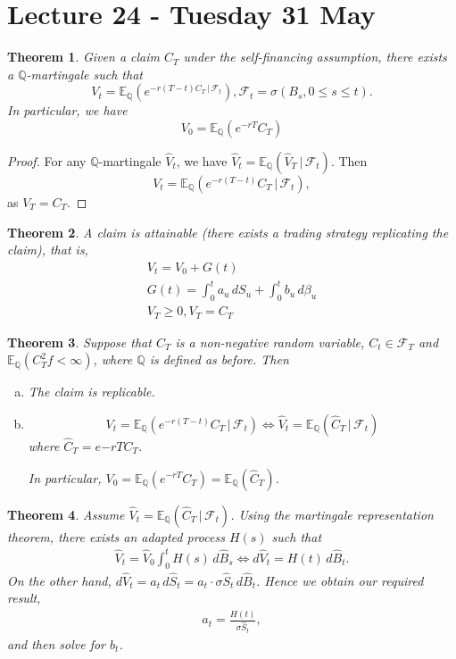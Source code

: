 \documentclass[10pt, oneside, reqno]{amsart}
\theoremstyle{plain}%
\newtheorem{thm}{Theorem}[section]
\theoremstyle{definition}
\theoremstyle{remark}
\newcommand{\given}{ \, | \,}
\newcommand{\Q}{\mathbb{Q}}
\newcommand{\E}{\mathbb{E}}
\newcommand{\sigf}{\mathcal{F}}
\begin{document}
\section{Lecture 24 - Tuesday 31 May} %
\label{sec:lecture_24_tuesday_31_may}
\begin{thm}
    Given a claim $C_T$ under the self-financing assumption, there exists a $\Q$-martingale such that \[
        V_t = \E_\Q\left( e^{-r(T-t) C_T \given \sigf_t} \right), \sigf_t = \sigma(B_s, 0 \leq s \leq t).
    \] In particular, we have \[
        V_0 = \E_\Q(e^{-rT}C_T)
    \]
\end{thm}

\begin{proof}
    For any $\Q$-martingale $\hat V_t$, we have $\hat V_t = \E_\Q(\hat V_T \given \sigf_t)$.  Then \[
        V_t = \E_\Q(e^{-r(T-t)}C_T \given \sigf_t),
    \] as $V_T = C_T$.  
\end{proof}

\begin{thm}
    A claim is attainable (there exists a trading strategy replicating the claim), that is, \begin{align*}
        V_t = V_0 + G(t) \\
        G(t) = \int_0^t a_u \, dS_u + \int_0^t b_u \, d\beta_u \\
        V_T \geq 0, V_T = C_T 
    \end{align*}
\end{thm}

\begin{thm}
    Suppose that $C_T$ is a non-negative random variable, $C_t \in \sigf_T$ and $\E_\Q(C_T^2f < \infty)$, where $\Q$ is defined as before.  Then \begin{enumerate}[(a)]
        \item The claim is replicable.
        \item \[
            V_t = \E_\Q\left( e^{-r(T-t)} C_T \given \sigf_t \right) \iff \hat V_t = \E_\Q(\hat C_T \given \sigf_t)
        \] where $\hat C_T = e{-rT} C_T$.
        
        In particular, $V_0 = \E_\Q(e^{-rT} C_T) = \E_\Q(\hat C_T)$.
    \end{enumerate}
\end{thm}

\begin{thm}
    Assume $\hat V_t = \E_\Q(\hat C_T \given \sigf_t)$.  Using the martingale representation theorem, there exists an adapted process $H(s)$ such that \begin{align*}
        \hat V_t = \hat V_0 \int_0^t H(s) \, d \hat B_s \iff d \hat V_t = H(t) \, d\hat B_t.
    \end{align*}  On the other hand, $d \hat V_t = a_t \, d\hat S_t = a_t \cdot \sigma \hat S_t \, d \hat B_t$.  Hence we obtain our required result, \begin{align*}
        a_t = \frac{H(t)}{\sigma \hat S_t},
    \end{align*} and then solve for $b_t$.
\end{thm}
\end{document}
